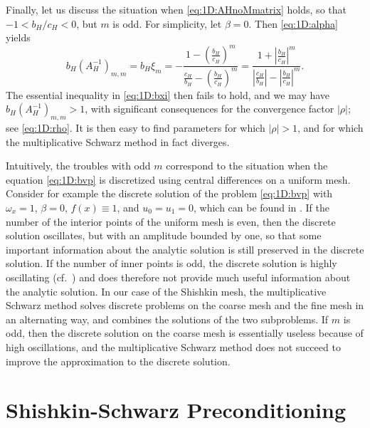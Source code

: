 
Finally, let us discuss the situation when \eqref{eq:1D:AHnoMmatrix} holds,
so that $-1<b_H/c_H<0$, but $m$ is odd. For simplicity, let $\beta=0$. Then
\eqref{eq:1D:alpha} yields
%
$$b_H (A_H^{-1})_{m,m}=b_H \xi_m = -\frac{1-\left(\frac{b_H}{c_H}\right)^m}{\frac{c_H}{b_H}- \left(\frac{b_H}{c_H}\right)^m}
=\frac{1+\left|\frac{b_H}{c_H}\right|^m}{\left|\frac{c_H}{b_H}\right|-
\left|\frac{b_H}{c_H}\right|^m}.$$
%
The essential inequality in \eqref{eq:1D:bxi} then fails to hold, and we may
have $b_H (A_H^{-1})_{m,m}>1$, with significant consequences for the convergence
factor $|\rho|$; see \eqref{eq:1D:rho}. It is then easy to find parameters
for which $|\rho|>1$, and for which the multiplicative Schwarz method in fact
diverges.

Intuitively, the troubles with odd $m$ correspond to the situation when
the equation \eqref{eq:1D:bvp} is discretized using central differences on a
uniform mesh. Consider for example the discrete solution of the problem
\eqref{eq:1D:bvp} with $\omega_x=1$, $\beta=0$, $f(x)\equiv 1$, and $u_0=u_1=0$,
which can be found in \cite[\S~4]{Sty05}. If the number of the interior
points of the uniform mesh is even, then the discrete solution oscillates, but
with an amplitude bounded by one, so that some important information about the
analytic solution is still preserved in the discrete solution. If the number
of inner points is odd, the discrete solution is highly oscillating
(cf.~\cite[Figure~4.1]{Sty05}) and does therefore not provide much useful
information about the analytic solution. In our case of the Shishkin mesh, the
multiplicative Schwarz method solves discrete problems on the coarse mesh and
the fine mesh in an alternating way, and combines the solutions of the two
subproblems. If $m$ is odd, then the discrete solution on the coarse mesh is
essentially useless because of high oscillations, and the multiplicative
Schwarz method does not succeed to improve the approximation to the discrete
solution.

\section{Shishkin-Schwarz Preconditioning}
\label{1D:ShishScwarzPrecon}

